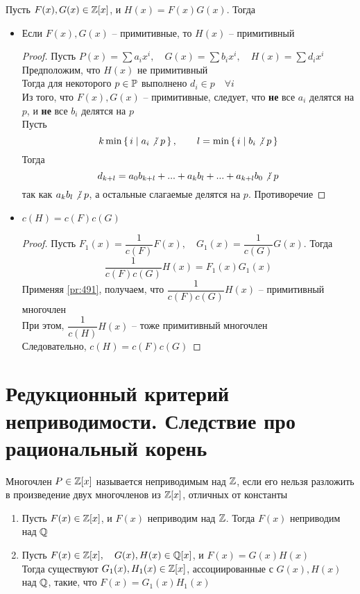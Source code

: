 \begin{lemma}[Гаусса]
	Пусть $F(x), G(x) \in \mathbb{Z}[x]$, и $H(x) = F(x)G(x)$. Тогда
	\begin{itemize}
		\item Если $F(x), G(x)$ -- примитивные, то $H(x)$ -- примитивный
		\begin{proof}
			Пусть $P(x) = \sum a_ix^i, \quad G(x) = \sum b_ix^i, \quad H(x) = \sum d_ix^i $ \\
			Предположим, что $H(x)$ не примитивный \\
			Тогда для некоторого $p \in \mathbb{P}$ выполнено $d_i \in p \quad \forall i $ \\
			Из того, что $F(x), G(x)$ -- примитивные, следует, что \textbf{не} все $a_i$ делятся на $p$, и \textbf{не} все $b_i$ делятся на $p$ \\
			Пусть
			$$ k \min\set{i | a_i \ndivby p}, \qquad l = \min\set{i | b_i \ndivby p} $$
			Тогда
			$$ d_{k + l} = a_0b_{k + l} + ... + a_kb_l + ... + a_{k + l}b_0 \ndivby p $$
			так как $a_kb_l \ndivby p$, а остальные слагаемые делятся на $p$. Противоречие
		\end{proof}
		\item \label{pr:493} $c(H) = c(F)c(G)$
		\begin{proof}
			Пусть $F_1(x) = \dfrac1{c(F)}F(x), \quad G_1(x) = \dfrac1{c(G)}G(x)$. Тогда
			$$ \frac1{c(F)c(G)}H(x) = F_1(x)G_1(x) $$
			Применяя \eqref{pr:491}, получаем, что $\dfrac1{c(F)c(G)}H(x)$ -- примитивный многочлен \\
			При этом, $\dfrac1{c(H)}H(x)$ -- тоже примитивный многочлен \\
			Следовательно, $c(H) = c(F)c(G)$
		\end{proof}
	\end{itemize}
\end{lemma}

\section{Редукционный критерий неприводимости. Следствие про рациональный корень}

\begin{definition}
	Многочлен $P \in \mathbb{Z}[x]$ называется неприводимым над $\mathbb{Z}$, если его нельзя разложить в произведение двух многочленов из $\mathbb{Z}[x]$, отличных от константы
\end{definition}

\begin{theorem}
	\hfill
	\begin{enumerate}
		\item Пусть $F(x) \in \mathbb{Z}[x]$, и $F(x)$ неприводим над $\mathbb{Z}$. Тогда $F(x)$ неприводим над $\mathbb{Q}$
		\item \label{th:501} Пусть $F(x) \in \mathbb{Z}[x], \quad G(x), H(x) \in \mathbb{Q}[x]$, и $F(x) = G(x)H(x)$ \\
		Тогда существуют $G_1(x), H_1(x) \in \mathbb{Z}[x]$, ассоциированные с $G(x), H(x)$ над $\mathbb{Q}$, такие, что $F(x) = G_1(x)H_1(x)$
	\end{enumerate}
\end{theorem}

